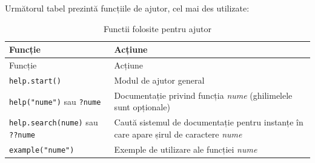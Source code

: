 \documentclass[]{article}
\begin{document}
Următorul tabel prezintă funcțiile de ajutor, cel mai des utilizate:

\begin{longtable}[]{@{}ll@{}}
\caption{Functii folosite pentru ajutor}\tabularnewline
\toprule
\begin{minipage}[b]{0.42\columnwidth}\raggedright
Funcție\strut
\end{minipage} & \begin{minipage}[b]{0.52\columnwidth}\raggedright
Acțiune\strut
\end{minipage}\tabularnewline
\midrule
\endfirsthead
\toprule
\begin{minipage}[b]{0.42\columnwidth}\raggedright
Funcție\strut
\end{minipage} & \begin{minipage}[b]{0.52\columnwidth}\raggedright
Acțiune\strut
\end{minipage}\tabularnewline
\midrule
\endhead
\begin{minipage}[t]{0.42\columnwidth}\raggedright
\texttt{help.start()}\strut
\end{minipage} & \begin{minipage}[t]{0.52\columnwidth}\raggedright
Modul de ajutor general\strut
\end{minipage}\tabularnewline
\begin{minipage}[t]{0.42\columnwidth}\raggedright
\texttt{help("nume")} sau \texttt{?nume}\strut
\end{minipage} & \begin{minipage}[t]{0.52\columnwidth}\raggedright
Documentație privind funcția \emph{nume} (ghilimelele sunt
opționale)\strut
\end{minipage}\tabularnewline
\begin{minipage}[t]{0.42\columnwidth}\raggedright
\texttt{help.search(nume)} sau \texttt{??nume}\strut
\end{minipage} & \begin{minipage}[t]{0.52\columnwidth}\raggedright
Caută sistemul de documentație pentru instanțe în care apare șirul de
caractere \emph{nume}\strut
\end{minipage}\tabularnewline
\begin{minipage}[t]{0.42\columnwidth}\raggedright
\texttt{example("nume")}\strut
\end{minipage} & \begin{minipage}[t]{0.52\columnwidth}\raggedright
Exemple de utilizare ale funcției \emph{nume}\strut
\end{minipage}\tabularnewline

\end{longtable}
\end{document}
